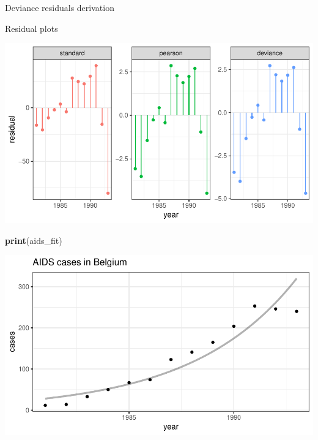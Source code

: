 \documentclass[11pt,ignorenonframetext,]{beamer}
\newenvironment{Shaded}{}{}
\newcommand{\KeywordTok}[1]{\textcolor[rgb]{0.00,0.44,0.13}{\textbf{{#1}}}}
\newcommand{\NormalTok}[1]{{#1}}
\let\oldShaded\Shaded
\let\endoldShaded\endShaded
\renewenvironment{Shaded}{\footnotesize\begin{spacing}{0.9}\oldShaded}{\endoldShaded\end{spacing}}
\begin{document}
\begin{frame}{Deviance residuals derivation}

\end{frame}

\begin{frame}{Residual plots}

\includegraphics[width=\textwidth]{Lec3_files/figure-beamer/unnamed-chunk-11-1}

\end{frame}

\begin{frame}[fragile]{}

\begin{Shaded}
\begin{Highlighting}[]
\KeywordTok{print}\NormalTok{(aids_fit)}
\end{Highlighting}
\end{Shaded}

\includegraphics{Lec3_files/figure-beamer/unnamed-chunk-12-1.pdf}

\end{frame}
\end{document}

